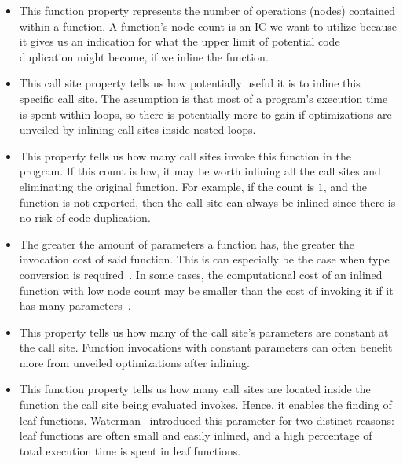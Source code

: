 \begin{itemize}

	\item {}

This function property represents the number of operations (nodes) contained
within a function. A function's node count is an IC we want to utilize because
it gives us an indication for what the upper limit of potential code duplication
might become, if we inline the function.

	\item {}

This call site property tells us how potentially useful it is to inline this
specific call site. The assumption is that most of a program's execution time is
spent within loops, so there is potentially more to gain if optimizations are
unveiled by inlining call sites inside nested loops.

	\item {}

This property tells us how many call sites invoke this function in the program.
If this count is low, it may be worth inlining all the call sites and
eliminating the original function. For example, if the count is $1$, and the
function is not exported, then the call site can always be inlined since there
is no risk of code duplication.

	\item {}

The greater the amount of parameters a function has, the greater the invocation
cost of said function. This is can especially be the case when type conversion
is required~\cite{AdaptvCompilAndInlingWaterman}. In some cases, the
computational cost of an inlined function with low node count may be smaller
than the cost of invoking it if it has many
parameters~\cite{AdaptvCompilAndInlingWaterman}.

	\item {}

This property tells us how many of the call site's parameters are constant at
the call site. Function invocations with constant parameters can often benefit
more from unveiled optimizations after inlining.

	\item {}

This function property tells us how many call sites are located inside the
function the call site being evaluated invokes. Hence, it enables the finding of
leaf functions. Waterman~\cite{AdaptvCompilAndInlingWaterman} introduced this
parameter for two distinct reasons: leaf functions are often small and easily
inlined, and a high percentage of total execution time is spent in leaf
functions.

\end{itemize}


